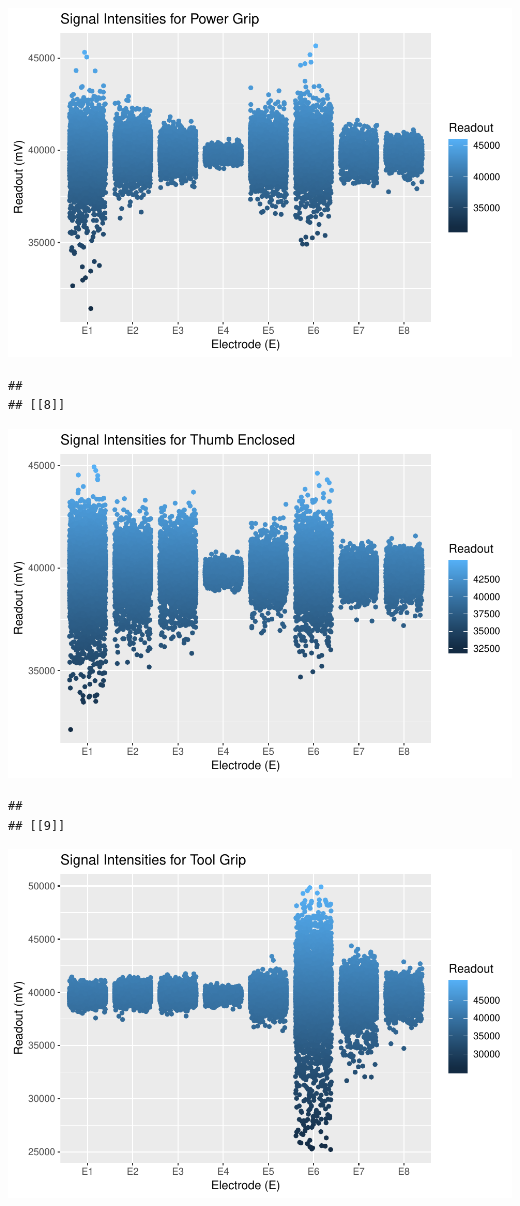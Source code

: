\documentclass[]{article}
\begin{document}
\includegraphics{Megahand_files/figure-latex/unnamed-chunk-6-7.pdf}

\begin{verbatim}
## 
## [[8]]
\end{verbatim}

\includegraphics{Megahand_files/figure-latex/unnamed-chunk-6-8.pdf}

\begin{verbatim}
## 
## [[9]]
\end{verbatim}

\includegraphics{Megahand_files/figure-latex/unnamed-chunk-6-9.pdf}
\end{document}
